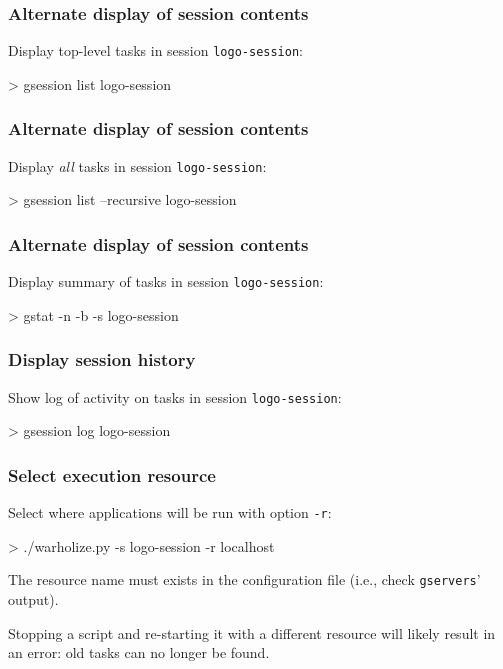 \documentclass[english,serif,mathserif,usenames,dvipsnames]{beamer}
\begin{document}
\begin{frame}
  \frametitle{Alternate display of session contents}

  Display top-level tasks in session \texttt{logo-session}:
\begin{semiverbatim}
    > gsession list logo-session
\end{semiverbatim}
\end{frame}


\begin{frame}
  \frametitle{Alternate display of session contents}

  Display \emph{all} tasks in session \texttt{logo-session}:
\begin{semiverbatim}
    > gsession list --recursive logo-session
\end{semiverbatim}
\end{frame}


\begin{frame}
  \frametitle{Alternate display of session contents}

  Display summary of tasks in session \texttt{logo-session}:
\begin{semiverbatim}
    > gstat -n -b -s logo-session
\end{semiverbatim}
\end{frame}


\begin{frame}
  \frametitle{Display session history}

  Show log of activity on tasks in session \texttt{logo-session}:
\begin{semiverbatim}
    > gsession log logo-session
\end{semiverbatim}
\end{frame}


\begin{frame}
  \frametitle{Select execution resource}

  Select where applications will be run with option \texttt{-r}:
\begin{semiverbatim}
    > ./warholize.py -s logo-session -r localhost
\end{semiverbatim}

  \+ The resource name must exists in the configuration file (i.e.,
  check \texttt{gservers}' output).

  \+ Stopping a script and re-starting it with a different resource
  will likely result in an error: old tasks can no longer be found.
\end{frame}
\end{document}
